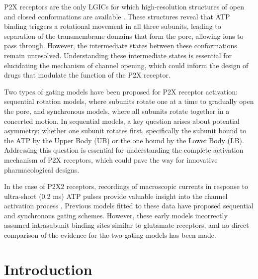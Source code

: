 \documentclass[pdflatex,sn-mathphys-num]{sn-jnl}%
\theoremstyle{thmstyleone}%
\theoremstyle{thmstyletwo}%
\theoremstyle{thmstylethree}%
\begin{document}
P2X receptors are the only LGICs for which high-resolution structures of open and closed conformations are available \cite{cerrada_p2x,abierta_p2x}. These structures reveal that ATP binding triggers a rotational movement in all three subunits, leading to separation of the transmembrane domains that form the pore, allowing ions to pass through. However, the intermediate states between these conformations remain unresolved. Understanding these intermediate states is essential for elucidating the mechanism of channel opening, which could inform the design of drugs that modulate the function of the P2X receptor.

Two types of gating models have been proposed for P2X receptor activation: sequential rotation models, where subunits rotate one at a time to gradually open the pore, and synchronous models, where all subunits rotate together in a concerted motion. In sequential models, a key question arises about potential asymmetry: whether one subunit rotates first, specifically the subunit bound to the ATP by the Upper Body (UB) or the one bound by the Lower Body (LB). Addressing this question is essential for understanding the complete activation mechanism of P2X receptors, which could pave the way for innovative pharmacological designs. 

In the case of P2X2 receptors, recordings of macroscopic currents in response to ultra-short (0.2 ms) ATP pulses provide valuable insight into the channel activation process \cite{Moffatt_hume}. Previous models fitted to these data have proposed sequential and synchronous gating schemes. However, these early models incorrectly assumed intrasubunit binding sites similar to glutamate receptors, and no direct comparison of the evidence for the two gating models has been made. 

\section{Introduction}
\end{document}

